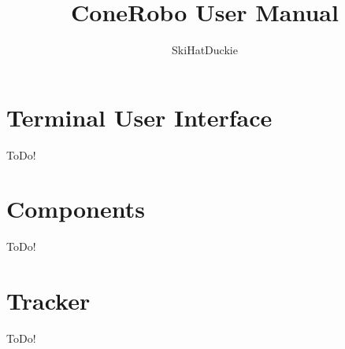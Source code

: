 \documentclass[11pt]{article}
\title{ConeRobo User Manual}
\author{SkiHatDuckie}
\begin{document}
   \maketitle
   \newpage

   \tableofcontents
   \newpage

   \section{Terminal User Interface}
   ToDo!

   \section{Components}
   ToDo!

   \section{Tracker}
   ToDo!
\end{document}
